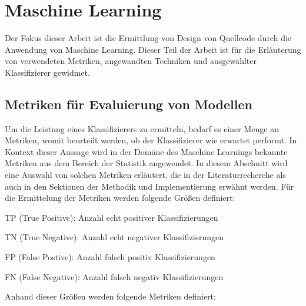 \section{Maschine Learning}

Der Fokus dieser Arbeit ist die Ermittlung von Design von Quellcode durch die Anwendung von Maschine Learning.
Dieser Teil der Arbeit ist für die Erläuterung von verwendeten Metriken, angewandten Techniken und ausgewählter Klassifizierer gewidmet.

\subsection{Metriken für Evaluierung von Modellen}

Um die Leistung eines Klassifizierers zu ermitteln, bedarf es einer Menge an Metriken, womit beurteilt werden, ob der Klassifizierer wie erwartet performt.
In Kontext dieser Aussage wird in der Domäne des Maschine Learnings bekannte Metriken aus dem Bereich der Statistik angewendet.
In diesem Abschnitt wird eine Auswahl von solchen Metriken erläutert, die in der Literaturrecherche als auch in den Sektionen der Methodik und Implementierung erwähnt werden.
Für die Ermittelung der Metriken werden folgende Größen definiert:

\begin{description}
    \item TP (True Positive): Anzahl echt positiver Klassifizierungen
    \item TN (True Negative): Anzahl echt negativer Klassifizierungen
    \item FP (False Postive): Anzahl falsch positiv Klassifizierungen
    \item FN (False Negative): Anzahl falsch negativ Klassifizierungen
\end{description}

Anhand dieser Größen werden folgende Metriken definiert:

